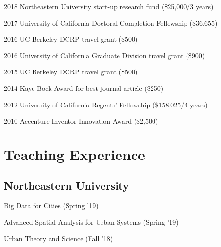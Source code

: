 \documentclass[12pt,letterpaper]{report}
\newcommand{\listitemspace}{0.15em}
\renewenvironment{itemize}
{\begin{list}{}{\setlength{\leftmargin}{0em}
				\setlength{\parskip}{0em}
				\setlength{\itemsep}{\listitemspace}
				\setlength{\parsep}{\listitemspace}}}
{\end{list}}
\begin{document}
\begin{tablist}


\item[2018] \tab Northeastern University start-up research fund (\$25,000/3 years)

\item[2017] \tab University of California Doctoral Completion Fellowship (\$36,655)

\item[2016] \tab UC Berkeley DCRP travel grant (\$500)

\item[2016] \tab University of California Graduate Division travel grant (\$900)

\item[2015] \tab UC Berkeley DCRP travel grant (\$500)

\item[2014] \tab Kaye Bock Award for best journal article (\$250)

\item[2012] \tab University of California Regents' Fellowship (\$158,025/4 years)

\item[2010] \tab Accenture Inventor Innovation Award (\$2,500)

\end{tablist}



\section*{Teaching Experience}

\subsection*{Northeastern University}
	
\begin{itemize}

\item Big Data for Cities (Spring '19)

\item Advanced Spatial Analysis for Urban Systems (Spring '19)

\item Urban Theory and Science (Fall '18)

\end{itemize}
\end{document}
